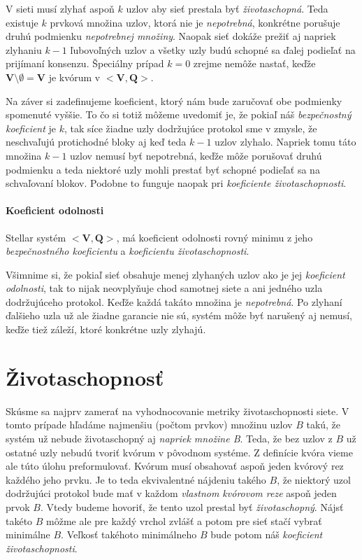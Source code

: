 \vspace{4mm}
V sieti musí zlyhať aspoň $k$ uzlov aby sieť prestala byť
\textit{životaschopná}. Teda existuje $k$ prvková množina uzlov, ktorá nie je
\textit{nepotrebná}, konkrétne porušuje druhú podmienku \textit{nepotrebnej množiny}.
Naopak sieť dokáže prežiť aj napriek zlyhaniu $k-1$ ľubovoľných uzlov a všetky uzly
budú schopné sa ďalej podieľať na prijímaní konsenzu.
Špeciálny prípad $k=0$ zrejme nemôže nastať, keďže
$\textbf{V} \setminus \emptyset = \textbf{V}$ je kvórum v $<\textbf{V},\textbf{Q}>$.

Na záver si zadefinujeme koeficient, ktorý nám bude zaručovať obe podmienky spomenuté
vyššie. To čo si totiž môžeme uvedomiť je, že pokiaľ náš \textit{bezpečnostný koeficient}
je $k$, tak síce žiadne uzly dodržujúce protokol sme  v zmysle, že
neschvaľujú protichodné bloky aj keď teda $k-1$ uzlov zlyhalo. Napriek tomu táto
množina $k-1$ uzlov nemusí byť nepotrebná, keďže môže porušovať druhú podmienku a teda
niektoré uzly mohli prestať byť schopné podieľať sa na schvaľovaní blokov.
Podobne to funguje naopak pri \textit{koeficiente životaschopnosti}.

\paragraph {Koeficient odolnosti} Stellar systém $<\textbf{V},\textbf{Q}>$,
má koeficient odolnosti rovný minimu z jeho \textit{bezpečnostného koeficientu}
a \textit{koeficientu životaschopnosti}.

\vspace{4mm}
Všimnime si, že pokiaľ sieť obsahuje menej zlyhaných uzlov ako je jej
\textit{koeficient odolnosti}, tak to nijak neovplyňuje chod samotnej siete a ani
jedného uzla dodržujúceho protokol. Keďže každá takáto množina je \textit{nepotrebná}.
Po zlyhaní ďalšieho uzla už ale žiadne garancie nie sú, systém môže byť narušený
aj nemusí, keďže tiež záleží, ktoré konkrétne uzly zlyhajú.

\section {Životaschopnosť}

Skúsme sa najprv zamerať na vyhodnocovanie metriky životaschopnosti siete.
V tomto prípade hľadáme najmenšiu (počtom prvkov) množinu uzlov $B$ takú, že
systém už nebude životaschopný aj \textit{napriek množine B}.
Teda, že bez uzlov z $B$ už ostatné uzly nebudú tvoriť kvórum v pôvodnom systéme.
Z definície kvóra vieme ale túto úlohu preformulovať. Kvórum musí obsahovať
aspoň jeden kvórový rez každého jeho prvku.
Je to teda ekvivalentné nájdeniu takého $B$, že niektorý uzol dodržujúci protokol
bude mať v každom \textit{vlastnom kvórovom reze} aspoň jeden prvok $B$.
Vtedy budeme hovoriť, že tento uzol prestal byť \textit{životaschopný}.
Nájsť takéto $B$ môžme ale pre každý vrchol zvlášť a potom pre sieť stačí vybrať
minimálne $B$. Veľkosť takéhoto minimálneho $B$ bude potom náš \textit{koeficient
životaschopnosti}.

